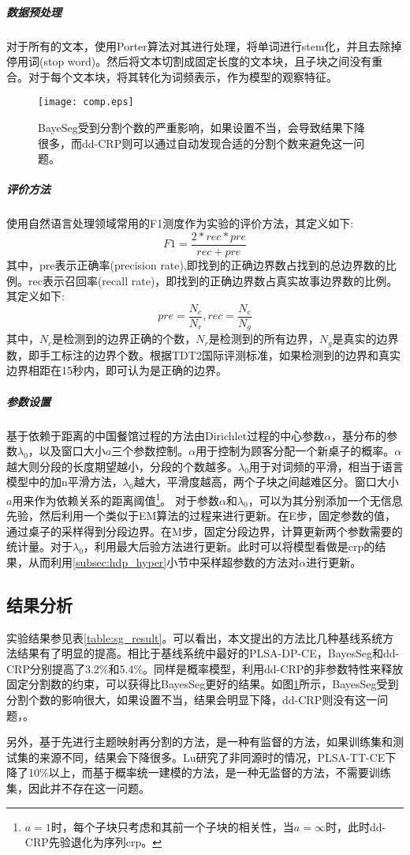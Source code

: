 \subparagraph{数据预处理}
对于所有的文本，使用Porter算法\cite{POR:09}对其进行处理，将单词进行stem化，并且去除掉停用词(stop word)。然后将文本切割成固定长度的文本块，且子块之间没有重合。对于每个文本块，将其转化为词频表示，作为模型的观察特征。
\begin{figure}\center
\vspace{10pt}
  \quad\texttt{[image: comp.eps]}\\
  \caption{BayeSeg受到分割个数的严重影响，如果设置不当，会导致结果下降很多，而dd-CRP则可以通过自动发现合适的分割个数来避免这一问题。}\label{fig:comp}
  \vspace{-12pt}
\end{figure}
\subparagraph{评价方法}
使用自然语言处理领域常用的F1测度作为实验的评价方法，其定义如下:
\begin{equation}
F1 = \frac{2*rec *pre}{rec+pre}
\end{equation}
其中，pre表示正确率(precision rate),即找到的正确边界数占找到的总边界数的比例。rec表示召回率(recall rate)，即找到的正确边界数占真实故事边界数的比例。其定义如下:
\begin{equation}
pre = \frac{N_c}{N_r}, rec = \frac{N_c}{N_g}
\end{equation}
其中，$N_c$是检测到的边界正确的个数，$N_r$是检测到的所有边界，$N_g$是真实的边界数，即手工标注的边界个数。根据TDT2国际评测标准，如果检测到的边界和真实边界相距在15秒内，即可认为是正确的边界。
\subparagraph{参数设置}
基于依赖于距离的中国餐馆过程的方法由Dirichlet过程的中心参数$\alpha$，基分布的参数$\lambda_0$，以及窗口大小$a$三个参数控制。$\alpha$用于控制为顾客分配一个新桌子的概率。$\alpha$越大则分段的长度期望越小，分段的个数越多。$\lambda_0$用于对词频的平滑，相当于语言模型中的加n平滑方法，$\lambda_0$越大，平滑度越高，两个子块之间越难区分。窗口大小$a$用来作为依赖关系的距离阈值\footnote{$a = 1$时，每个子块只考虑和其前一个子块的相关性，当$a = \infty$时，此时dd-CRP先验退化为序列crp。}。
对于参数$\alpha$和$\lambda_0$，可以为其分别添加一个无信息先验，然后利用一个类似于EM算法的过程来进行更新。在E步，固定参数的值，通过桌子的采样得到分段边界。在M步，固定分段边界，计算更新两个参数需要的统计量。对于$\lambda_0$，利用最大后验方法进行更新。此时可以将模型看做是crp的结果，从而利用\ref{subsec:hdp_hyper}小节中采样超参数的方法对$\alpha$进行更新。

\subsection{结果分析}
实验结果参见表\ref{table:sg_result}。可以看出，本文提出的方法比几种基线系统方法结果有了明显的提高。相比于基线系统中最好的PLSA-DP-CE，BayesSeg和dd-CRP分别提高了3.2\%和5.4\%。同样是概率模型，利用dd-CRP的非参数特性来释放固定分割数的约束，可以获得比BayesSeg更好的结果。如图\ref{fig:comp}所示，BayesSeg受到分割个数的影响很大，如果设置不当，结果会明显下降，dd-CRP则没有这一问题，。

另外，基于先进行主题映射再分割的方法，是一种有监督的方法，如果训练集和测试集的来源不同，结果会下降很多。Lu研究了非同源时的情况\cite{Lu:2012:thesis}，PLSA-TT-CE下降了10\%以上，而基于概率统一建模的方法，是一种无监督的方法，不需要训练集，因此并不存在这一问题。               